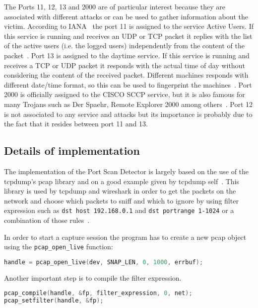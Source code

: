 The Ports 11, 12, 13 and 2000 are of particular interest because they are associated with different attacks or can be used
to gather information about the victim.
According to IANA~\cite{IANAPORTS} the port 11 is assigned to the service Active Users. If this service is running and
receives an UDP or TCP packet it replies with the list of the active users (i.e. the logged users) independently from the content of the packet~\cite{systat}.
Port 13 is assigned to the daytime service. If this service is running and receives a TCP or UDP packet it responds with the actual time of day without considering
the content of the received packet. Different machines responds with different date/time format, so this can be used to fingerprint the machines~\cite{portDetails}.
Port 2000 is officially assigned to the CISCO SCCP service, but it is also famous for 
many Trojans such as Der Spaehr, Remote Explorer 2000 among others~\cite{portDetails}.
Port 12 is not associated to any service and attacks but its importance is probably due to the fact that it resides between port 11 and 13.

\subsection{Details of implementation}
The implementation of the Port Scan Detector is largely based on the use of the tcpdump's pcap library
and on a good example given by tcpdump self~\cite{pcaptcpdump}.
This library is used by tcpdump and wireshark in order to get  the packets on the network and choose 
which packets to sniff and which to ignore by using filter expression such as \lstinline!dst host 192.168.0.1! and \lstinline!dst portrange 1-1024!
or a combination of those rules~\cite{pcapFilterRules}.



In order to start a capture session the program has to create a new pcap object using the \lstinline!pcap_open_live! function:
\begin{lstlisting}[frame= single, language=C, caption={Create a new pcap handler.}, label=lst:open_live]
handle = pcap_open_live(dev, SNAP_LEN, 0, 1000, errbuf);
\end{lstlisting}
Another important step is to compile the filter expression. 
\begin{lstlisting}[frame= single, language=C, caption=Pcap functions called to compile the filter expression and to set it.]
pcap_compile(handle, &fp, filter_expression, 0, net);
pcap_setfilter(handle, &fp);
\end{lstlisting}

